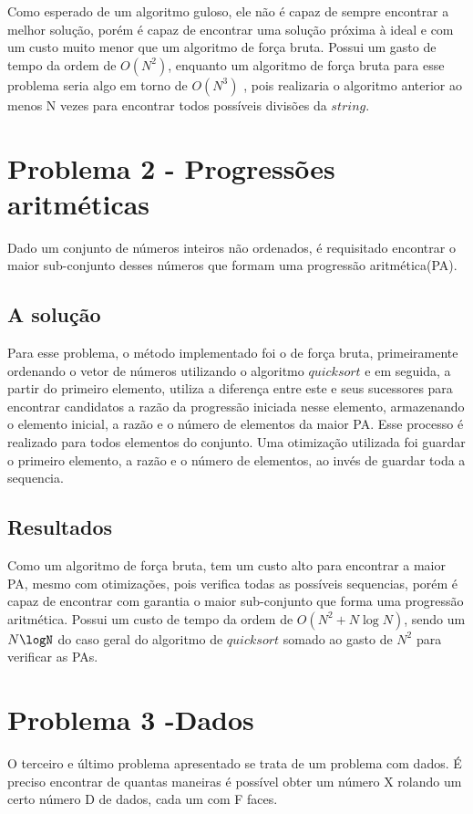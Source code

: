 \documentclass[letterpaper,12pt]{article}
\begin{document}
Como esperado de um algoritmo guloso, ele não é capaz de sempre encontrar a melhor solução, porém é capaz de encontrar uma solução próxima à ideal e com um custo muito menor que um algoritmo de força bruta. Possui um gasto de tempo da ordem de $O(N^2)$, enquanto um algoritmo de força bruta para esse problema seria algo em torno de $O(N^3)$ , pois realizaria o algoritmo anterior ao menos N vezes para encontrar todos possíveis divisões da $string$.

\section{Problema 2 - Progressões aritméticas}

Dado um conjunto de números inteiros não ordenados, é requisitado encontrar o maior sub-conjunto desses números que formam uma progressão aritmética(PA).

\subsection{A solução}

Para esse problema, o método implementado foi o de força bruta, primeiramente ordenando o vetor de números utilizando o algoritmo $quick sort$ e em seguida, a partir do primeiro elemento, utiliza a diferença entre este e seus sucessores para encontrar candidatos a razão da progressão iniciada nesse elemento, armazenando o elemento inicial, a razão e o número de elementos da maior PA. Esse processo é realizado para todos elementos do conjunto. Uma otimização utilizada foi guardar o primeiro elemento, a razão e o número de elementos, ao invés de guardar toda a sequencia.

\subsection{Resultados}

Como um algoritmo de força bruta, tem um custo alto para encontrar a maior PA, mesmo com otimizações, pois verifica todas as possíveis sequencias, porém é capaz de encontrar com garantia o maior sub-conjunto que forma uma progressão aritmética. Possui um custo de tempo da ordem de $O(N^2 + N\log N)$, sendo um $N\logN$ do caso geral do algoritmo de $quicksort$ somado ao gasto de $N^2$ para verificar as PAs.

\section{Problema 3 -Dados}
O terceiro e último problema apresentado se trata de um problema com dados. É preciso encontrar de quantas maneiras é possível obter um número X rolando um certo número D de dados, cada um com F faces.
\end{document}
